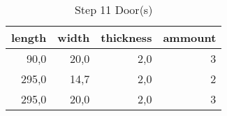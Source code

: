 \begin{table}[h!]
\centering
\caption{Step 11 Door(s)}
\begin{tabular}{rrrr}
\toprule
 length &  width &  thickness &  ammount \\
\midrule
   90,0 &   20,0 &        2,0 &        3 \\
  295,0 &   14,7 &        2,0 &        2 \\
  295,0 &   20,0 &        2,0 &        3 \\
\bottomrule
\end{tabular}
\end{table}

